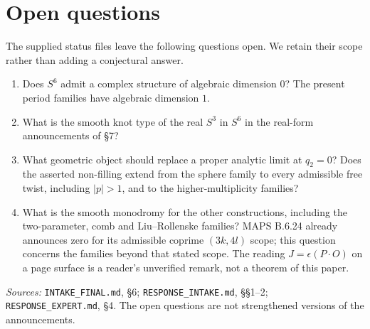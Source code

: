 \section{Open questions}\label{sec:open}
The supplied status files leave the following questions open. We retain their scope rather than adding a conjectural answer.
\begin{enumerate}[leftmargin=*]
\item Does $S^6$ admit a complex structure of algebraic dimension $0$? The present period families have algebraic dimension $1$.
\item What is the smooth knot type of the real $S^3$ in $S^6$ in the real-form announcements of \S7?
\item What geometric object should replace a proper analytic limit at $q_2=0$? Does the asserted non-filling extend from the sphere family to every admissible free twist, including $|p|>1$, and to the higher-multiplicity families?
\item What is the smooth monodromy for the other constructions, including the two-parameter, comb and Liu--Rollenske families? MAPS B.6.24 already announces zero for its admissible coprime $(3k,4l)$ scope; this question concerns the families beyond that stated scope. The reading $J=\epsilon(P\cdot O)$ on a page surface is a reader's unverified remark, not a theorem of this paper.
\end{enumerate}
\noindent\textit{Sources:} \texttt{INTAKE\_FINAL.md}, \S6; \texttt{RESPONSE\_INTAKE.md}, \S\S1--2; \texttt{RESPONSE\_EXPERT.md}, \S4. The open questions are not strengthened versions of the announcements.

